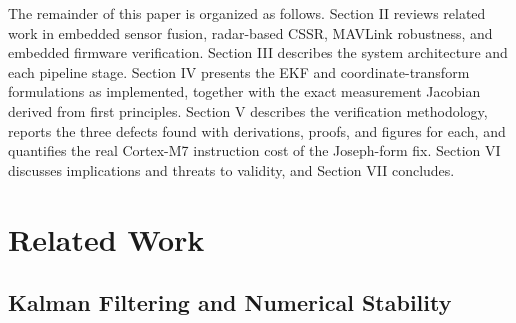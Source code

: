 \documentclass[conference]{IEEEtran}
\begin{document}
The remainder of this paper is organized as follows. Section II reviews related work in embedded sensor fusion, radar-based CSSR, MAVLink robustness, and embedded firmware verification. Section III describes the system architecture and each pipeline stage. Section IV presents the EKF and coordinate-transform formulations as implemented, together with the exact measurement Jacobian derived from first principles. Section V describes the verification methodology, reports the three defects found with derivations, proofs, and figures for each, and quantifies the real Cortex-M7 instruction cost of the Joseph-form fix. Section VI discusses implications and threats to validity, and Section VII concludes.

\section{Related Work}

\subsection{Kalman Filtering and Numerical Stability}
\end{document}
